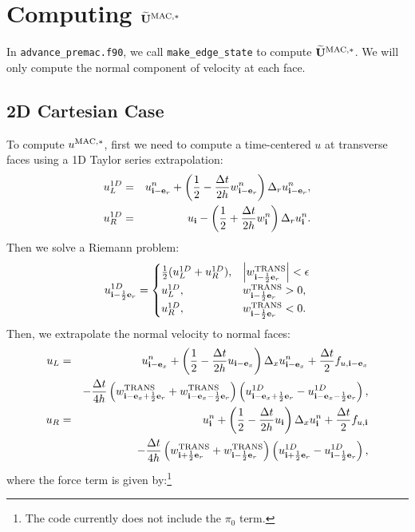 \documentclass[11pt]{article}
\def\half  {\frac{1}{2}}
\def\dt    {\Delta t}
\def\mac   {\rm MAC}
\def\trans {\rm TRANS}
\def\eb    {{\bf e}}
\def\ib    {{\bf i}}
\def\Ubt   {\widetilde{\bf U}}
\begin{document}
\section{Computing $\Ubt^{\mac,*}$}
In {\tt advance\_premac.f90}, we call {\tt make\_edge\_state} to compute $\Ubt^{\mac,*}$.  We will only compute the normal component of velocity at each face.\\
\subsection{2D Cartesian Case}
To compute $u^{\mac,*}$, first we need to compute a time-centered $u$ at transverse faces using a 1D Taylor series extrapolation:
\begin{eqnarray}
u_L^{1D} &=& u_{\ib-\eb_r}^n + \left(\half - \frac{\dt}{2h}w_{\ib-\eb_r}^n\right)\Delta_r u_{\ib-\eb_r}^n, \\
u_R^{1D} &=& u_{\ib} - \left(\half + \frac{\dt}{2h}w_{\ib}^n\right)\Delta_r u_{\ib}^n.
\end{eqnarray}
Then we solve a Riemann problem:
\begin{equation}
u_{\ib-\half\eb_r}^{1D} =
\begin{cases}
\half(u_L^{1D} + u_R^{1D}), & \left|w^{\trans}_{\ib-\half\eb_r}\right| < \epsilon \\
u_L^{1D}, & w^{\trans}_{\ib-\half\eb_r} > 0, \\
u_R^{1D}, & w^{\trans}_{\ib-\half\eb_r} < 0. \\
\end{cases}
\end{equation}
Then, we extrapolate the normal velocity to normal faces:
\begin{eqnarray}
u_L &=& u_{\ib-\eb_x}^n + \left(\half - \frac{\dt}{2h}u_{\ib-\eb_x}\right)\Delta_x u_{\ib-\eb_x}^n + \frac{\dt}{2}f_{u,\ib-\eb_x} \nonumber \\
&& - \frac{\dt}{4h}\left(w_{\ib-\eb_x+\half\eb_r}^{\trans}+w_{\ib-\eb_x-\half\eb_r}^{\trans}\right)\left(u_{\ib-\eb_x+\half\eb_r}^{1D} - u_{\ib-\eb_x-\half\eb_r}^{1D}\right), \\
u_R &=& u_{\ib}^n + \left(\half - \frac{\dt}{2h}u_{\ib}\right)\Delta_x u_{\ib}^n + \frac{\dt}{2}f_{u,\ib} \nonumber \\
&& - \frac{\dt}{4h}\left(w_{\ib+\half\eb_r}^{\trans}+w_{\ib-\half\eb_r}^{\trans}\right)\left(u_{\ib+\half\eb_r}^{1D} - u_{\ib-\half\eb_r}^{1D}\right),
\end{eqnarray}
where the force term is given by:\footnote{The code currently does not include the $\pi_0$ term.}
\end{document}
